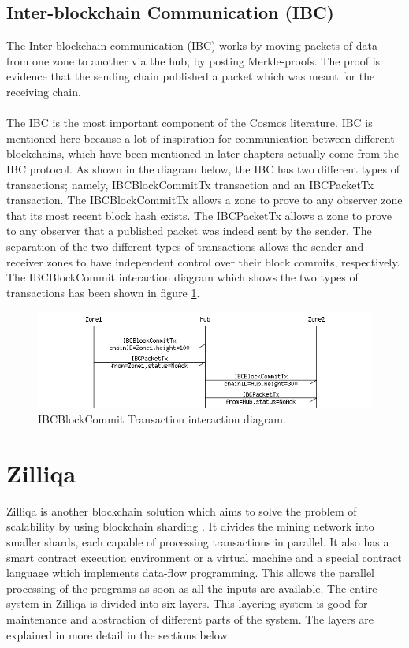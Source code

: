 \documentclass[a4paper,twoside,phd]{BYUPhys}
\begin{document}
\subsection{Inter-blockchain Communication (IBC)}
The Inter-blockchain communication (IBC) works by moving packets of data from one zone to another via the hub, by posting Merkle-proofs\cite{}. The proof is evidence that the sending chain published a packet which was meant for the receiving chain. 
\\
\\
The IBC is the most important component of the Cosmos literature. IBC is mentioned here because a lot of inspiration for communication between different blockchains, which have been mentioned in later chapters actually come from the IBC protocol. As shown in the diagram below, the IBC has two different types of transactions; namely, IBCBlockCommitTx transaction and an IBCPacketTx transaction\cite{}. The IBCBlockCommitTx allows a zone to prove to any observer zone that its most recent block hash exists\cite{}. The IBCPacketTx allows a zone to prove to any observer that a published packet was indeed sent by the sender\cite{}. The separation of the two different types of transactions allows the sender and receiver zones to have independent control over their block commits, respectively. The IBCBlockCommit interaction diagram which shows the two types of transactions has been shown in figure \ref{fig:1}.
\begin{figure}
  \includegraphics[width=\linewidth]{ibc_transactions.png}
  \caption{IBCBlockCommit Transaction interaction diagram\cite{}.}
  \label{fig:1}
\end{figure}

\section{Zilliqa}
Zilliqa is another blockchain solution which aims to solve the problem of scalability by using blockchain sharding \cite{}. It divides the mining network into smaller shards, each capable of processing transactions in parallel\cite{}. It also has a smart contract execution environment or a virtual machine and a special contract language which implements data-flow programming\cite{}. This allows the parallel processing of the programs as soon as all the inputs are available. The entire system in Zilliqa is divided into six layers. This layering system is good for maintenance and abstraction of different parts of the system. The layers are explained in more detail in the sections below\cite{}:
\end{document}
